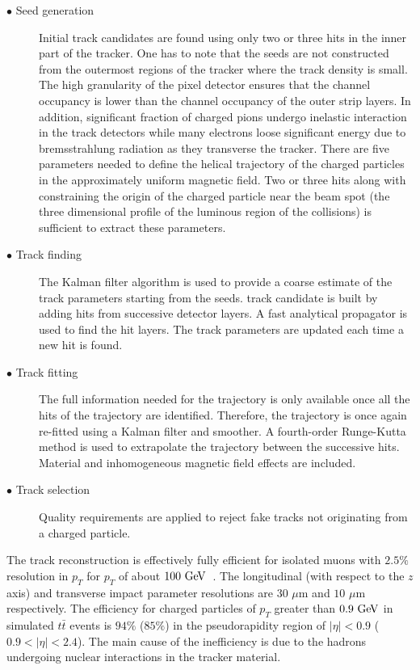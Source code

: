 \begin{description}
\item[$\bullet$ Seed generation]  Initial track candidates are found using only two or three hits in the inner part of the tracker. One has to note that the seeds are not constructed from the outermost regions of the tracker where the track density is small. The high granularity of the pixel detector ensures that the channel occupancy is lower than the channel occupancy of the outer strip layers. In addition, significant fraction of charged pions undergo inelastic interaction in the track detectors while many electrons loose significant energy due to bremsstrahlung radiation as they transverse the tracker. There are five parameters needed to define the helical trajectory of the charged particles in the approximately uniform magnetic field. Two or three hits along with constraining the origin of the charged particle near the beam spot (the three dimensional profile of the luminous region of the collisions) is sufficient to extract these parameters.
\item[$\bullet$ Track finding]  The Kalman filter algorithm is used to provide a coarse estimate of the track parameters starting from the seeds.  track candidate is built by adding hits from successive detector layers. A fast analytical propagator is used to find the hit layers. The track parameters are updated each time a new hit is found.
\item[$\bullet$ Track fitting] The full information needed for the trajectory is only available once all the hits of the trajectory are identified. Therefore, the trajectory is once again re-fitted using a Kalman filter and smoother. A fourth-order Runge-Kutta method is used to extrapolate the trajectory between the successive hits. Material and inhomogeneous magnetic field effects are included.
\item[$\bullet$ Track selection] Quality requirements are applied to reject fake tracks not originating from a charged particle. 
\end{description}

The track reconstruction is effectively fully efficient for isolated muons with $2.5\%$ resolution in $p_{T}$ for $p_{T}$ of about $100~\mathrm{Ge\kern -0.1em V}$~\cite{Chatrchyan:2014fea}. The longitudinal (with respect to the $z$ axis) and transverse impact parameter resolutions are $30$ $\mu$m and $10$ $\mu$m respectively. The efficiency for charged particles of $p_{T}$ greater than $0.9~\mathrm{Ge\kern -0.1em V}$ in simulated $t\bar{t}$ events is $94\%$ ($85\%$) in the pseudorapidity region of $|\eta|<0.9$ ($0.9<|\eta|<2.4$). The main cause of the inefficiency is due to the hadrons undergoing nuclear interactions in the tracker material.   

